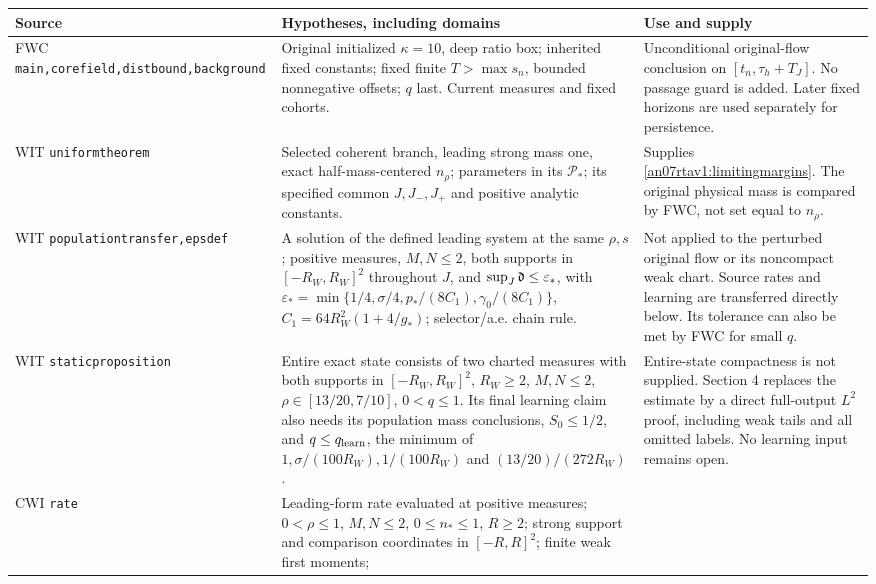 \documentclass[11pt]{article}
\numberwithin{equation}{section}
\begin{document}
\small
\begin{longtable}{>{\raggedright\arraybackslash}p{}
 >{\raggedright\arraybackslash}p{}
 >{\raggedright\arraybackslash}p{}}
\toprule Source & Hypotheses, including domains & Use and supply\\\midrule\endhead
FWC \texttt{main,\allowbreak corefield,\allowbreak distbound,\allowbreak background}
& Original initialized \(\kappa=10\), deep ratio box; inherited
 fixed constants; fixed finite \(T>\max s_n\), bounded nonnegative
 offsets; \(q\) last. Current measures and fixed cohorts.
& Unconditional original-flow conclusion on \([t_n,\tau_h+T_J]\).
 No passage guard is added. Later fixed horizons are used separately
 for persistence.\\
WIT \texttt{uniformtheorem}
& Selected coherent branch, leading strong mass one, exact
 half-mass-centered \(n_\rho\); parameters in its \(\mathcal P_*\);
 its specified common \(J,J_-,J_+\) and positive analytic constants.
& Supplies \eqref{an07rtav1:limitingmargins}. The original physical
 mass is compared by FWC, not set equal to \(n_\rho\).\\
WIT \texttt{populationtransfer,\allowbreak epsdef}
& A solution of the defined leading system at the same \(\rho,s\);
 positive measures, \(M,N\le2\), both supports in \([-R_W,R_W]^2\)
 throughout \(J\), and \(\sup_J\mathfrak d\le\varepsilon_*\), with
 \(\varepsilon_*=\min\{1/4,\sigma/4,p_*/(8C_1),\gamma_0/(8C_1)\}\),
 \(C_1=64R_W^2(1+4/g_*)\); selector/a.e. chain rule.
& Not applied to the perturbed original flow or its noncompact weak
 chart. Source rates and learning are transferred directly below.
 Its tolerance can also be met by FWC for small \(q\).\\
WIT \texttt{staticproposition}
& Entire exact state consists of two charted measures with both
 supports in \([-R_W,R_W]^2\), \(R_W\ge2\), \(M,N\le2\),
 \(\rho\in[13/20,7/10]\), \(0<q\le1\). Its final learning claim
 also needs its population mass conclusions, \(S_0\le1/2\),
 and \(q\le q_{\rm learn}\), the minimum of
 \(1,\sigma/(100R_W),1/(100R_W)\) and
 \((13/20)/(272R_W)\).
& Entire-state compactness is not supplied. Section 4 replaces the
 estimate by a direct full-output \(L^2\) proof, including weak tails
 and all omitted labels. No learning input remains open.\\
CWI \texttt{rate}
& Leading-form rate evaluated at positive measures; \(0<\rho\le1\),
 \(M,N\le2\), \(0\le n_*\le1\), \(R\ge2\); strong support and
 comparison coordinates in \([-R,R]^2\); finite weak first moments;

\end{longtable}
\end{document}
